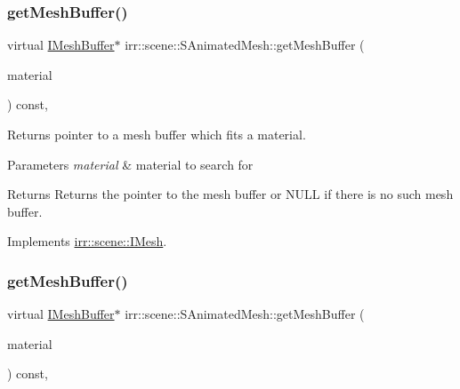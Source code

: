 \subsubsection{\texorpdfstring{get\+Mesh\+Buffer()}{getMeshBuffer()}\hspace{0.1cm}{\footnotesize\ttfamily [1/2]}}
{\footnotesize\ttfamily virtual \hyperlink{classirr_1_1scene_1_1IMeshBuffer}{I\+Mesh\+Buffer}$\ast$ irr\+::scene\+::\+S\+Animated\+Mesh\+::get\+Mesh\+Buffer (\begin{DoxyParamCaption}\item[{const \hyperlink{classirr_1_1video_1_1SMaterial}{video\+::\+S\+Material} \&}]{material }\end{DoxyParamCaption}) const\hspace{0.3cm}{\ttfamily [inline]}, {\ttfamily [virtual]}}



Returns pointer to a mesh buffer which fits a material. 


\begin{DoxyParams}{Parameters}
{\em material} & material to search for \\
\hline
\end{DoxyParams}
\begin{DoxyReturn}{Returns}
Returns the pointer to the mesh buffer or N\+U\+LL if there is no such mesh buffer. 
\end{DoxyReturn}


Implements \hyperlink{classirr_1_1scene_1_1IMesh_a9573dace82efb01ba1f35f9cc28a4ced}{irr\+::scene\+::\+I\+Mesh}.

\mbox{\label{structirr_1_1scene_1_1SAnimatedMesh_a3c010c881f315e56a05f40632f3c7f79}} 
\subsubsection{\texorpdfstring{get\+Mesh\+Buffer()}{getMeshBuffer()}\hspace{0.1cm}{\footnotesize\ttfamily [2/2]}}
{\footnotesize\ttfamily virtual \hyperlink{classirr_1_1scene_1_1IMeshBuffer}{I\+Mesh\+Buffer}$\ast$ irr\+::scene\+::\+S\+Animated\+Mesh\+::get\+Mesh\+Buffer (\begin{DoxyParamCaption}\item[{const \hyperlink{classirr_1_1video_1_1SMaterial}{video\+::\+S\+Material} \&}]{material }\end{DoxyParamCaption}) const\hspace{0.3cm}{\ttfamily [inline]}, {\ttfamily [virtual]}}



